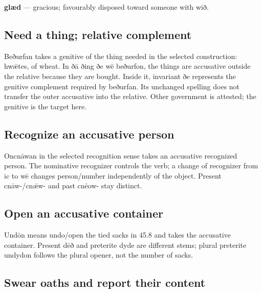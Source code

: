 \textbf{glæd} — gracious; favourably disposed toward someone with wið.

\subsection*{Need a thing; relative complement}

Beðurfan takes a genitive of the thing needed in the selected construction: hwǣtes, of wheat. In ðā ðing ðe wē beðurfon, the things are accusative outside the relative because they are bought. Inside it, invariant ðe represents the genitive complement required by beðurfan. Its unchanged spelling does not transfer the outer accusative into the relative. Other government is attested; the genitive is the target here.

\subsection*{Recognize an accusative person}

Oncnāwan in the selected recognition sense takes an accusative recognized person. The nominative recognizer controls the verb; a change of recognizer from ic to wē changes person/\allowbreak{}number independently of the object. Present cnāw-/\allowbreak{}cnǣw- and past cnēow- stay distinct.

\subsection*{Open an accusative container}

Undōn means undo/\allowbreak{}open the tied sacks in 45.8 and takes the accusative container. Present dēð and preterite dyde are different stems; plural preterite undydon follows the plural opener, not the number of sacks.

\subsection*{Swear oaths and report their content}

